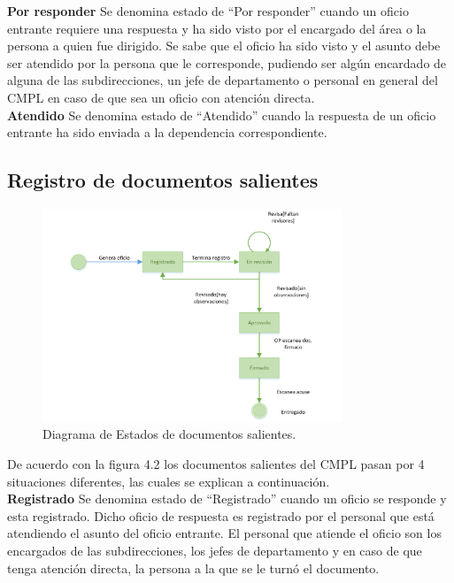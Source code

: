 \textbf{Por responder}
Se denomina estado de “Por responder” cuando un oficio entrante requiere una respuesta y ha sido visto por el encargado del área o la persona a quien fue dirigido. Se sabe que el oficio ha sido visto y el asunto debe ser atendido por la persona que le corresponde, pudiendo ser algún encardado de alguna de las subdirecciones, un jefe de departamento o personal en general del CMPL en caso de que sea un oficio con atención directa.\\

\textbf{Atendido}
Se denomina estado de “Atendido” cuando la respuesta de un oficio entrante ha sido enviada a la dependencia correspondiente.

\subsection{Registro de documentos salientes}
	
	\begin{figure}[htbp!]
		\centering
			\includegraphics[width=0.8\textwidth]{images/estadossalientes}
		\caption{Diagrama de Estados de documentos salientes.}
	\end{figure}
	
De acuerdo con la figura 4.2 los documentos salientes del CMPL pasan por 4 situaciones diferentes, las cuales se explican a continuación.\\

\textbf{Registrado}
Se denomina estado de “Registrado” cuando un oficio se responde y esta registrado. Dicho oficio de respuesta es registrado por el personal que está atendiendo el asunto del oficio entrante. El personal que atiende el oficio son los encargados de las subdirecciones, los jefes de departamento y en caso de que tenga atención directa, la persona a la que se le turnó el documento.\\

